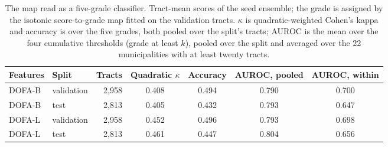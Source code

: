 \begin{table}[htbp]
\centering
\caption{The map read as a five-grade classifier. Tract-mean scores of the seed ensemble; the grade is assigned by the isotonic score-to-grade map fitted on the validation tracts. $\kappa$ is quadratic-weighted Cohen's kappa and accuracy is over the five grades, both pooled over the split's tracts; AUROC is the mean over the four cumulative thresholds (grade at least $k$), pooled over the split and averaged over the 22 municipalities with at least twenty tracts.}
\small
\begin{tabular}{llrcccc}
\toprule
Features & Split & Tracts & Quadratic $\kappa$ & Accuracy & AUROC, pooled & AUROC, within\\
\midrule
DOFA-B & validation & 2{,}958 & 0.408 & 0.494 & 0.790 & 0.700\\
DOFA-B & test & 2{,}813 & 0.405 & 0.432 & 0.793 & 0.647\\
DOFA-L & validation & 2{,}958 & 0.452 & 0.496 & 0.793 & 0.698\\
DOFA-L & test & 2{,}813 & 0.461 & 0.447 & 0.804 & 0.656\\
\bottomrule
\end{tabular}
\label{tab:classification}
\end{table}
